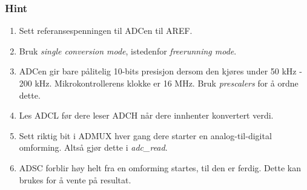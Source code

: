 \documentclass[11pt,a4paper]{article}
\begin{document}
\subsubsection{Hint}
\begin{enumerate}
\item Sett referansespenningen til ADCen til AREF.
\item Bruk \textit{single conversion mode}, istedenfor \textit{freerunning mode}.
\item ADCen gir bare pålitelig 10-bits presisjon dersom den kjøres under 50 kHz - 200 kHz. Mikrokontrollerens klokke er 16 MHz. Bruk \textit{prescalers} for å ordne dette.
\item Les ADCL før dere leser ADCH når dere innhenter konvertert verdi.
\item Sett riktig bit i ADMUX hver gang dere starter en analog-til-digital omforming. Altså gjør dette i \textit{adc\_read}.
\item ADSC forblir høy helt fra en omforming startes, til den er ferdig. Dette kan brukes for å vente på resultat.
\end{enumerate}
\end{document}
